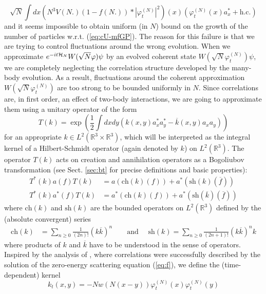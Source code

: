 \documentclass[11pt,a4paper]{article}
\newcommand{\bR}{{\mathbb R}}
\newcommand{\cH}{{\cal H}}
\begin{document}
\begin{equation}\label{eq:lin-N} \sqrt{N} \int dx \left( N^3 V(N.) (1- f(N.)) * |\varphi^{(N)}_t|^2 \right) (x) \left( \varphi^{(N)}_t (x) a_x^* + \text{h.c.} \right)  \end{equation}
and it seems impossible to obtain uniform (in $N$) bound on the growth of the number of particles w.r.t. (\ref{eq:cU-mfGP}). The reason for this failure is that we are trying to control fluctuations around the wrong evolution. When we approximate $e^{-it \cH_N} W(\sqrt{N} \varphi) \psi$ by an evolved coherent state $W(\sqrt{N} \varphi^{(N)}_t) \psi$, we are completely neglecting the correlation structure developed by the many-body evolution. As a result, fluctuations around the coherent approximation $W(\sqrt{N} \varphi^{(N)}_t)$ are too strong to be bounded uniformly in $N$. 
Since correlations are, in first order, an effect of two-body interactions, we are going to approximate them using a unitary operator of the form
\[ T(k) = \exp\left(\frac{1}{2} \int dx dy \left(k(x,y) a_x^* a_y^* - \overline{k} (x,y) a_x a_y \right)\right) \]
for an appropriate $k \in L^2 (\bR^3 \times \bR^3)$, which will be interpreted as the integral kernel of a Hilbert-Schmidt operator (again denoted by $k$) on $L^2 (\bR^3)$. The operator $T(k)$ acts on creation and annihilation operators as a Bogoliubov transformation (see Sect. \ref{sec:bt} for precise definitions and basic properties):
\[ \begin{split} T^* (k) a (f) T (k) &= a(\text{ch} (k) (f)) + a^* (\text{sh} (k) (\overline{f})) \\
T^*(k) a^* (f) T (k) &= a^* (\text{ch} (k) (f)) + a^* (\text{sh} (\overline{k}) (\overline{f}))
\end{split} \]
where $\text{ch} (k)$ and $\text{sh} (k)$ are the bounded operators on $L^2 (\bR^3)$ defined by the (absolute convergent) series
\[ \begin{split} 
\text{ch} (k) & = \sum_{n\geq 0} \frac{1}{(2n)!} (k\overline{k})^n \qquad \text{and } \quad 
\text{sh} (k)   = \sum_{n \geq 0} \frac{1}{(2n+1)!} (k\overline{k})^n k \end{split} \]
where products of $k$ and $\overline{k}$ have to be understood in the sense of operators. Inspired by the analysis of \cite{ESY1,ESY2,ESY3,ESY4}, where correlations were successfully described by the solution of the zero-energy scattering equation (\ref{eq:f}), we define the (time-dependent) kernel 
\begin{equation}\label{eq:kt-def0} k_t (x,y) = - N w (N(x-y)) \varphi^{(N)}_t (x) \varphi^{(N)}_t (y) \end{equation}
\end{document}
